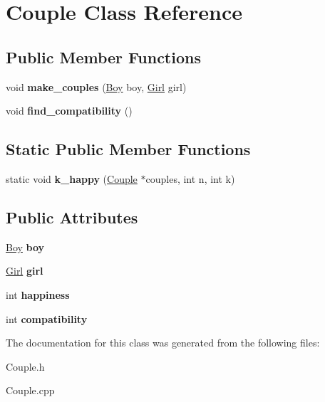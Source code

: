 \hypertarget{class_couple}{}\section{Couple Class Reference}
\label{class_couple}
\subsection*{Public Member Functions}
\begin{DoxyCompactItemize}
\item 
\mbox{\label{class_couple_a1ea5a69da1af9ff8b7a663be1d8ae05c}} 
void {\bfseries make\+\_\+couples} (\hyperlink{class_boy}{Boy} boy, \hyperlink{class_girl}{Girl} girl)
\item 
\mbox{\label{class_couple_afd44c116312fd411df285bde11e24b94}} 
void {\bfseries find\+\_\+compatibility} ()
\end{DoxyCompactItemize}
\subsection*{Static Public Member Functions}
\begin{DoxyCompactItemize}
\item 
\mbox{\label{class_couple_a60b6b151595d937d91d7cf9471996a9a}} 
static void {\bfseries k\+\_\+happy} (\hyperlink{class_couple}{Couple} $\ast$couples, int n, int k)
\end{DoxyCompactItemize}
\subsection*{Public Attributes}
\begin{DoxyCompactItemize}
\item 
\mbox{\label{class_couple_a2f4c4e8df15d0a648023a29d48a4dbc8}} 
\hyperlink{class_boy}{Boy} {\bfseries boy}
\item 
\mbox{\label{class_couple_a0e654a04711c8a9e1f53472c9e57cb5a}} 
\hyperlink{class_girl}{Girl} {\bfseries girl}
\item 
\mbox{\label{class_couple_aee78d616688f0cccff84e1c23cb31f7a}} 
int {\bfseries happiness}
\item 
\mbox{\label{class_couple_af47d6ced781259303e10836182abb8c1}} 
int {\bfseries compatibility}
\end{DoxyCompactItemize}


The documentation for this class was generated from the following files\+:\begin{DoxyCompactItemize}
\item 
Couple.\+h\item 
Couple.\+cpp\end{DoxyCompactItemize}
